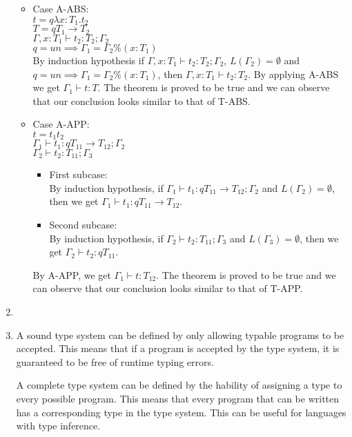 \documentclass[a4paper]{article}
\begin{document}
\begin{enumerate}
\begin{itemize}
    \item Case A-ABS:
    \\$t = q \lambda x : T_1 . t_2$
    \\$T = qT_1 \rightarrow T_2$
    \\$\Gamma, x:T_1 \vdash t_2 : T_2;\Gamma_2$
    \\$q = un \implies \Gamma_1 = \Gamma_2 \% (x:T_1)$
    \\By induction hypothesis if $\Gamma, x:T_1 \vdash t_2 : T_2;\Gamma_2$, $L(\Gamma_2) = \emptyset$ and $q = un \implies \Gamma_1 = \Gamma_2 \% (x:T_1)$, then $\Gamma, x:T_1 \vdash t_2 : T_2$. By applying A-ABS we get $\Gamma_1 \vdash t : T$. The theorem is proved to be true and we can observe that our conclusion looks similar to that of T-ABS.

    \item Case A-APP:
    \\$t = t_1 t_2$
    \\$\Gamma_1 \vdash t_1 : q T_{11} \rightarrow T_{12};\Gamma_2$
    \\$\Gamma_2 \vdash t_2 : T_{11};\Gamma_3$
    \begin{itemize}
      \item First subcase:
      \\ By induction hypothesis, if $\Gamma_1 \vdash t_1 : q T_{11} \rightarrow T_{12};\Gamma_2$ and $L(\Gamma_2) = \emptyset$, then we get $\Gamma_1 \vdash t_1 : q T_{11} \rightarrow T_{12}$.
      \item Second subcase:
      \\ By induction hypothesis, if $\Gamma_2 \vdash t_2 : T_{11};\Gamma_3$ and $L(\Gamma_3) = \emptyset$, then we get $\Gamma_2 \vdash t_2 : q T_{11}$.
    \end{itemize}
    By A-APP, we get $\Gamma_1 \vdash t:T_{12}$. The theorem is proved to be true and we can observe that our conclusion looks similar to that of T-APP.
  \end{itemize}
  \item
  \item A sound type system can be defined by only allowing typable programs to be accepted. This means that if a program is accepted by the type system, it is guaranteed to be free of runtime typing errors. 
  
  A complete type system can be defined by the hability of assigning a type to every possible program. This means that every program that can be written has a corresponding type in the type system. This can be useful for languages with type inference.


\end{enumerate}
\end{document}
